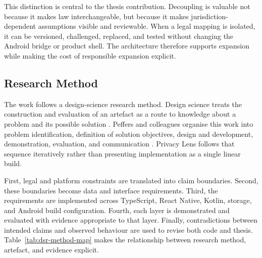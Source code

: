 This distinction is central to the thesis contribution. Decoupling is valuable not because it makes law interchangeable, but because it makes jurisdiction-dependent assumptions visible and reviewable. When a legal mapping is isolated, it can be versioned, challenged, replaced, and tested without changing the Android bridge or product shell. The architecture therefore supports expansion while making the cost of responsible expansion explicit.

\subsection{Research Method}

The work follows a design-science research method. Design science treats the construction and evaluation of an artefact as a route to knowledge about a problem and its possible solution \cite{hevner2004}. Peffers and colleagues organise this work into problem identification, definition of solution objectives, design and development, demonstration, evaluation, and communication \cite{peffers2007}. Privacy Lens follows that sequence iteratively rather than presenting implementation as a single linear build.

First, legal and platform constraints are translated into claim boundaries. Second, these boundaries become data and interface requirements. Third, the requirements are implemented across TypeScript, React Native, Kotlin, storage, and Android build configuration. Fourth, each layer is demonstrated and evaluated with evidence appropriate to that layer. Finally, contradictions between intended claims and observed behaviour are used to revise both code and thesis. Table~\ref{tab:dsr-method-map} makes the relationship between research method, artefact, and evidence explicit.

